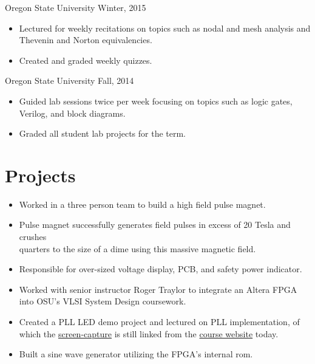 \documentclass[]{friggeri-cv}
\begin{document}
         {Oregon State University}
         {Winter, 2015}
         \begin{itemize}
           \item Lectured for weekly recitations on topics such as nodal and mesh 
                 analysis and Thevenin and Norton equivalencies.
           \item Created and graded weekly quizzes.
         \end{itemize}

         {Oregon State University}
         {Fall, 2014}
         \begin{itemize}
           \item Guided lab sessions twice per week focusing on topics such as logic
                 gates, Verilog, and block diagrams.
           \item Graded all student lab projects for the term.
         \end{itemize}



\section{Projects}  

         \begin{itemize}
           \item Worked in a three person team to build a high field pulse magnet.
           \item Pulse magnet successfully generates field pulses in excess of 20 Tesla and 
                 crushes \\ quarters to the size of a dime using this massive magnetic field.
           \item Responsible for over-sized voltage display, PCB, and safety power indicator.
         \end{itemize} 
    

         \begin{itemize}
           \item Worked with senior instructor Roger Traylor to integrate an Altera FPGA 
                 into OSU's VLSI System Design coursework.
           \item Created a PLL LED demo project and lectured on PLL implementation, of which 
                 the 
                 \href{https://drive.google.com/file/d/0B_A8ZVw8vDrfZHMtQ0pHdFRmeWM/view}{screen-capture} 
                 is still linked from the 
                 \href{http://classes.engr.oregonstate.edu/eecs/spring2016/ece474/}{course website} 
                today.
           \item Built a sine wave generator utilizing the FPGA's internal rom.
         \end{itemize}
\end{document}
